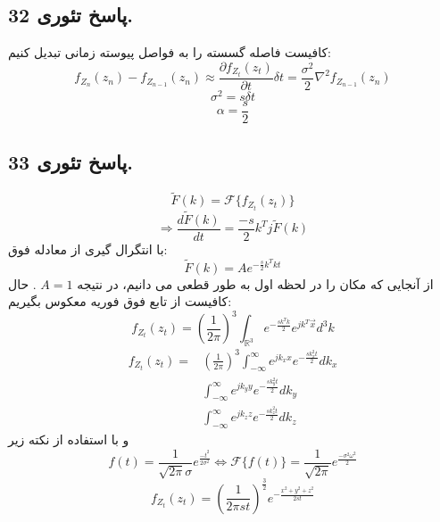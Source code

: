 \documentclass[]{article}
\begin{document}
\subsection{پاسخ تئوری 32.}
کافیست فاصله گسسته را به فواصل پیوسته زمانی تبدیل کنیم:
\begin{equation}
	\nonumber
	f_{Z_n}(z_n) - f_{Z_{n-1}}(z_n) \approx \frac{\partial f_{Z_t}(z_t)}{\partial t} \delta t=\frac{\sigma^2}{2} \nabla^2 f_{Z_{n-1}}(z_n)
\end{equation}
\begin{equation}
	\nonumber
	\sigma^2 = s\delta t
\end{equation}
\begin{equation}
	\nonumber
	\alpha = \frac{s}{2}
\end{equation}
\newpage
\subsection{پاسخ تئوری 33.}
\begin{equation}
	\nonumber
	\tilde{F}(k) = \mathcal{F}\{f_{Z_t}(z_t)\}
\end{equation}
\begin{equation}
	\nonumber
	\Rightarrow \frac{d\tilde{F}(k)}{dt} = \frac{-s}{2} k^T j \tilde{F}(k)
\end{equation}
با انتگرال گیری از معادله فوق:
\begin{equation}
	\nonumber
	\tilde{F}(k) = A e^{-\frac{s}{2}k^T k t}
\end{equation}
از آنجایی که مکان را در لحظه اول به طور قطعی می دانیم، در نتیجه 
$A = 1$
. حال کافیست از تابع فوق فوریه معکوس بگیریم:
\begin{equation}
	\nonumber
	f_{Z_t}(z_t)= (\frac{1}{2\pi})^3 \int_{\mathbb{R}^3}e^{-\frac{sk^Tk}{2}} e^{jk^T\vec{x}} d^3k
\end{equation}
\begin{equation}
	\nonumber
	\begin{split}
		f_{Z_t}(z_t)  =&(\frac{1}{2\pi})^3 \int_{-\infty}^{\infty} e^{jk_x x} e^{-\frac{sk_x^2 t}{2}} dk_x\\
		&\int_{-\infty}^{\infty} e^{jk_y y} e^{-\frac{sk_y^2 t}{2}} dk_y\\
		&\int_{-\infty}^{\infty} e^{jk_z z} e^{-\frac{sk_z^2 t}{2}} dk_z
	\end{split}
\end{equation}
و با استفاده از نکته زیر 
\begin{equation}
	\nonumber
	f(t) = \frac{1}{\sqrt{2\pi}\sigma} e^{\frac{-t^2}{2\sigma^2}} \Leftrightarrow \mathcal{F}\{f(t)\} = \frac{1}{\sqrt{2\pi}} e^{\frac{-\sigma^2 \omega^2}{2}}
\end{equation}
\begin{equation}
	\nonumber
	f_{Z_t}(z_t) = (\frac{1}{2\pi st})^{\frac{3}{2}} e^{-\frac{x^2 + y^2 + z^2}{2st}}
\end{equation}
\newpage
\end{document}
